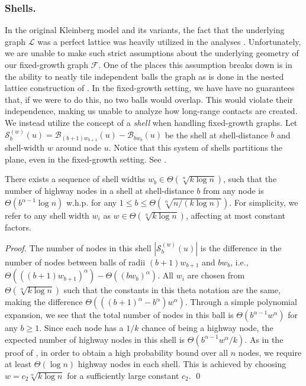\vspace*{-\bigskipamount}

\subsubsection{Shells.}

In the original Kleinberg model and its variants, the fact that the underlying
graph $\mathcal{L}$ was a perfect lattice was heavily utilized in the analyses 
\cite{kleinberg2000small,martel,gila2023highway}.
Unfortunately, we are unable to make such strict assumptions about the
underlying geometry of our fixed-growth graph $\mathcal{F}$.
One of the places this assumption breaks down is in the ability to neatly tile
independent balls the graph as is done in the nested lattice construction of
\cite{gila2023highway}.
In the fixed-growth setting, we have have no guarantees that, 
if we were to do this, no two balls would overlap.
This would violate their independence, making us unable to analyze how long-range
contacts are created.
We instead utilize the concept of a \emph{shell} when handling fixed-growth graphs.
Let $\mathcal{S}_b^{(w)}(u) = \mathcal{B}_{(b + 1)w_{b + 1}}(u) - \mathcal{B}_{bw_b}(u)$
be the shell at shell-distance $b$ and shell-width $w$ around node $u$.
Notice that this system of shells partitions the plane, 
even in the fixed-growth setting.
See .

\begin{lemma} \label{lem:shells}
    There exists a sequence of shell widths $w_b \in \Theta(\sqrt[\alpha]{k
    \log{n}})$, such that the number of highway nodes in a shell at
    shell-distance $b$ from any node is $\Theta(b^{\alpha - 1} \log{n})$ w.h.p.
    for any $1 \leq b \leq \Theta(\sqrt[\alpha]{n / (k \log{n})})$.
    For simplicity, we refer to any shell width $w_i$ as $w \in
    \Theta(\sqrt[\alpha]{k \log{n}})$, affecting at most constant factors.
\end{lemma}

\begin{proof}
    The number of nodes in this shell $|\mathcal{S}_b^{(w)}(u)|$ is the difference
    in the number of nodes between balls of radii $(b + 1)w_{b + 1}$ and $bw_b$, i.e.,
    $\Theta(((b + 1)w_{b + 1})^\alpha) - \Theta((bw_b)^\alpha)$.
    All $w_i$ are chosen from $\Theta(\sqrt[\alpha]{k \log{n}})$ such that
    the constants in this theta notation are the same, making the difference
    $\Theta(((b + 1)^\alpha - b^\alpha)w^\alpha)$.
    Through a simple polynomial expansion, we see that the total number of nodes in
    this ball is $\Theta(b^{\alpha - 1} w^\alpha)$ for any $b \ge 1$.
    Since each node has a $1/k$ chance of being a highway node, the expected number
    of highway nodes in this shell is $\Theta(b^{\alpha - 1} w^\alpha / k)$.
    As in the proof of , in order to obtain a high probability
    bound over all $n$ nodes, we require at least $\Theta(\log{n})$ highway
    nodes in each shell.
    This is achieved by choosing $w = c_2 \sqrt[\alpha]{k \log{n}}$ for a
    sufficiently large constant $c_2$.
    \qed
\end{proof}

